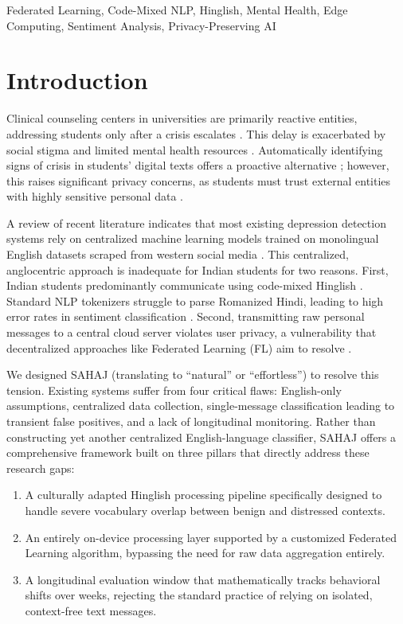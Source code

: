 \documentclass[conference]{IEEEtran}
\begin{document}
\begin{IEEEkeywords}
Federated Learning, Code-Mixed NLP, Hinglish, Mental Health, Edge Computing, Sentiment Analysis, Privacy-Preserving AI
\end{IEEEkeywords}

\section{Introduction}
Clinical counseling centers in universities are primarily reactive entities, addressing students only after a crisis escalates \cite{b1,b3}. This delay is exacerbated by social stigma and limited mental health resources \cite{b13}. Automatically identifying signs of crisis in students' digital texts offers a proactive alternative \cite{b10}; however, this raises significant privacy concerns, as students must trust external entities with highly sensitive personal data \cite{b2}.

A review of recent literature indicates that most existing depression detection systems rely on centralized machine learning models trained on monolingual English datasets scraped from western social media \cite{b4,b5}. This centralized, anglocentric approach is inadequate for Indian students for two reasons. First, Indian students predominantly communicate using code-mixed Hinglish \cite{b7}. Standard NLP tokenizers struggle to parse Romanized Hindi, leading to high error rates in sentiment classification \cite{b8,b9}. Second, transmitting raw personal messages to a central cloud server violates user privacy, a vulnerability that decentralized approaches like Federated Learning (FL) aim to resolve \cite{b6,b11}.

We designed SAHAJ (translating to ``natural'' or ``effortless'') to resolve this tension. Existing systems suffer from four critical flaws: English-only assumptions, centralized data collection, single-message classification leading to transient false positives, and a lack of longitudinal monitoring. Rather than constructing yet another centralized English-language classifier, SAHAJ offers a comprehensive framework built on three pillars that directly address these research gaps:
\begin{enumerate}
    \item A culturally adapted Hinglish processing pipeline specifically designed to handle severe vocabulary overlap between benign and distressed contexts.
    \item An entirely on-device processing layer supported by a customized Federated Learning algorithm, bypassing the need for raw data aggregation entirely.
    \item A longitudinal evaluation window that mathematically tracks behavioral shifts over weeks, rejecting the standard practice of relying on isolated, context-free text messages.
\end{enumerate}
\end{document}
